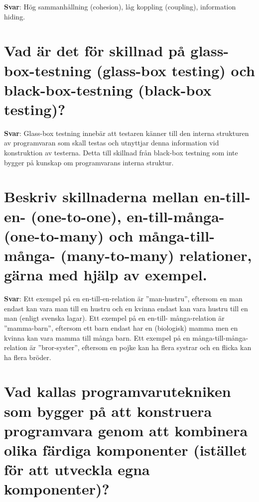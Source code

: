 \documentclass[a4paper,11pt,oneside]{book}
\begin{document}
\begin{sloppypar}
\label{q:228:sa:sv:True}

\textbf{Svar}: H\"og sammanh\r{a}llning (cohesion), l\r{a}g koppling (coupling), information hiding.



\section{Vad \"ar det f\"or skillnad p\r{a} glass-box-testning (glass-box testing) och black-box-testning (black-box testing)?}

\label{q:229:sa:sv:True}

\textbf{Svar}: Glass-box testning inneb\"ar att testaren k\"anner till den interna strukturen av programvaran som skall testas och utnyttjar denna information vid konstruktion av testerna. Detta till skillnad fr\r{a}n black-box testning som inte bygger p\r{a} kunskap om programvarans interna struktur.



\section{Beskriv skillnaderna mellan en-till-en- (one-to-one), en-till-m\r{a}nga- (one-to-many) och m\r{a}nga-till- m\r{a}nga- (many-to-many) relationer, g\"arna med hj\"alp av exempel.}

\label{q:230:sa:sv:True}

\textbf{Svar}: Ett exempel p\r{a} en en-till-en-relation \"ar {\textquotedblright}man-hustru{\textquotedblright}, eftersom en man endast kan vara man till en hustru och en kvinna endast kan vara hustru till en man (enligt svenska lagar). Ett exempel p\r{a} en en-till- m\r{a}nga-relation \"ar {\textquotedblright}mamma-barn{\textquotedblright}, eftersom ett barn endast har en (biologisk) mamma men en kvinna kan vara mamma till m\r{a}nga barn. Ett exempel p\r{a} en m\r{a}nga-till-m\r{a}nga-relation \"ar {\textquotedblright}bror-syster{\textquotedblright}, eftersom en pojke kan ha flera systrar och en flicka kan ha flera br\"oder.



\section{Vad kallas programvarutekniken som bygger p\r{a} att konstruera programvara genom att kombinera olika f\"ardiga komponenter (ist\"allet f\"or att utveckla egna komponenter)?}

\label{q:231:sa:sv:True}


\end{sloppypar}
\end{document}
